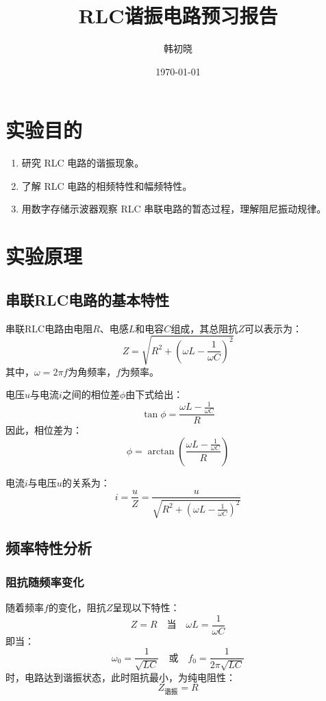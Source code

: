 \documentclass[a4paper,10pt]{article}
\begin{document}
\title{RLC谐振电路预习报告} %
\author{韩初晓} %
\date{\today} %
\maketitle %

\newpage

\section{实验目的}
\begin{enumerate}
    \item 研究 RLC 电路的谐振现象。
    \item 了解 RLC 电路的相频特性和幅频特性。
    \item 用数字存储示波器观察 RLC 串联电路的暂态过程，理解阻尼振动规律。
\end{enumerate}

\section{实验原理}

\subsection{串联RLC电路的基本特性}

串联RLC电路由电阻\( R \)、电感\( L \)和电容\( C \)组成，其总阻抗\( Z \)可以表示为：
\[
Z = \sqrt{R^2 + \left(\omega L - \frac{1}{\omega C}\right)^2}
\]
其中，\( \omega = 2\pi f \)为角频率，\( f \)为频率。

电压\( u \)与电流\( i \)之间的相位差\( \phi \)由下式给出：
\[
\tan \phi = \frac{\omega L - \frac{1}{\omega C}}{R}
\]
因此，相位差为：
\[
\phi = \arctan\left(\frac{\omega L - \frac{1}{\omega C}}{R}\right)
\]

电流\( i \)与电压\( u \)的关系为：
\[
i = \frac{u}{Z} = \frac{u}{\sqrt{R^2 + \left(\omega L - \frac{1}{\omega C}\right)^2}}
\]

\subsection{频率特性分析}

\subsubsection{阻抗随频率变化}

随着频率\( f \)的变化，阻抗\( Z \)呈现以下特性：
\[
Z = R \quad \text{当} \quad \omega L = \frac{1}{\omega C}
\]
即当：
\[
\omega_0 = \frac{1}{\sqrt{LC}} \quad \text{或} \quad f_0 = \frac{1}{2\pi\sqrt{LC}}
\]
时，电路达到谐振状态，此时阻抗最小，为纯电阻性：
\[
Z_{\text{谐振}} = R
\]
\end{document}
